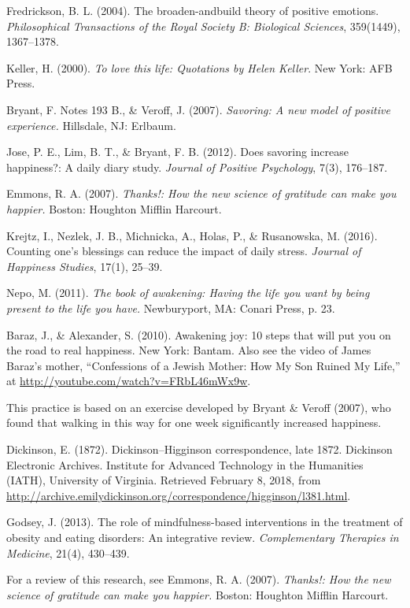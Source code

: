 \begin{thebibliography}{999}
	 Fredrickson, B. L. (2004). The broaden-andbuild theory of positive emotions. \textit{Philosophical Transactions of the Royal Society B: Biological Sciences}, 359(1449), 1367–1378.
	
	 Keller, H. (2000). \textit{To love this life: Quotations by Helen Keller}. New York: AFB Press.
	
	 Bryant, F. Notes 193 B., \& Veroff, J. (2007). \textit{Savoring: A new model of positive experience.} Hillsdale, NJ: Erlbaum.
	
	 Jose, P. E., Lim, B. T., \& Bryant, F. B. (2012). Does savoring increase happiness?: A daily diary study. \textit{Journal of Positive Psychology}, 7(3), 176–187.
	
	 Emmons, R. A. (2007). \textit{Thanks!: How the new science of gratitude can make you happier.} Boston: Houghton Mifflin Harcourt.
	
	 Krejtz, I., Nezlek, J. B., Michnicka, A., Holas, P., \& Rusanowska, M. (2016). Counting one’s blessings can reduce the impact of daily stress. \textit{Journal of Happiness Studies}, 17(1), 25–39.
	
	 Nepo, M. (2011). \textit{The book of awakening: Having the life you want by being present to the life you have.} Newburyport, MA: Conari Press, p. 23.
	
	 Baraz, J., \& Alexander, S. (2010). Awakening joy: 10 steps that will put you on the road to real happiness. New York: Bantam. Also see the video of James Baraz’s mother, “Confessions of a Jewish Mother: How My Son Ruined My Life,” at \url{http://youtube.com/watch?v=FRbL46mWx9w}.
	
	 This practice is based on an exercise developed by Bryant \& Veroff (2007), who found that walking in this way for one week significantly increased happiness.
	
	 Dickinson, E. (1872). Dickinson–Higginson correspondence, late 1872. Dickinson Electronic Archives. Institute for Advanced Technology in the Humanities (IATH), University of Virginia. Retrieved February 8, 2018, from \url{http://archive.emilydickinson.org/correspondence/higginson/l381.html}.
	
	 Godsey, J. (2013). The role of mindfulness-based interventions in the treatment of obesity and eating disorders: An integrative review. \textit{Complementary Therapies in Medicine}, 21(4), 430–439.
	
	 For a review of this research, see Emmons, R. A. (2007). \textit{Thanks!: How the new science of gratitude can make you happier.} Boston: Houghton Mifflin Harcourt.
	

\end{thebibliography}
